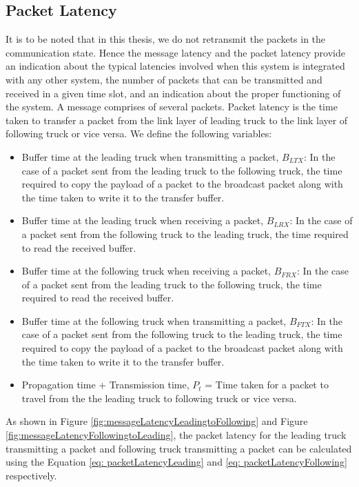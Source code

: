 \subsection{Packet Latency}
It is to be noted that in this thesis, we do not retransmit the packets in the communication state. Hence the message latency and the packet latency provide an indication about the typical latencies involved when this system is integrated with any other system, the number of packets that can be transmitted and received in a given time slot, and an indication about the proper functioning of the system. A message comprises of several packets. Packet latency is the time taken to transfer a packet from the link layer of leading truck to the link layer of following truck or vice versa.
We define the following variables:
\begin{itemize}
    \item Buffer time at the leading truck when transmitting a packet, \emph{$B_{LTX}$}: In the case of a packet sent from the leading truck to the following truck, the time required to copy the payload of a packet to the broadcast packet along with the time taken to write it to the transfer buffer.
    
    \item Buffer time at the leading truck when receiving a packet, \emph{$B_{LRX}$}:  In the case of a packet sent from the following truck to the leading truck, the time required to read the received buffer.
    
    \item Buffer time at the following truck when receiving a packet, \emph{$B_{FRX}$}: In the case of a packet sent from the leading truck to the following truck, the time required to read the received buffer.
    
    \item Buffer time at the following truck when transmitting a packet, \emph{$B_{FTX}$}: In the case of a packet sent from the following truck to the leading truck, the time required to copy the payload of a packet to the broadcast packet along with the time taken to write it to the transfer buffer.
    
    \item Propagation time + Transmission time, \emph{$P_{t}$} = Time taken for a packet to travel from the the leading truck to following truck or vice versa. 
\end{itemize}
As shown in Figure \ref{fig:messageLatencyLeadingtoFollowing} and Figure \ref{fig:messageLatencyFollowingtoLeading}, the packet latency for the leading truck transmitting a packet and following truck transmitting a packet can be calculated using the Equation \ref{eq: packetLatencyLeading} and \ref{eq: packetLatencyFollowing} respectively. 
